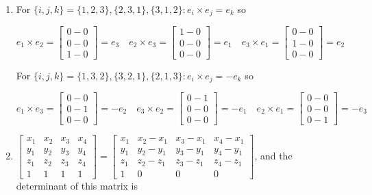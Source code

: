 \documentclass{article}
\begin{document}
\begin{enumerate}
	\item For $\{i,j,k\}=\{1,2,3\},\{2,3,1\},\{3,1,2\}: e_i\times e_j=e_k$ so
	\begin{center}
	$e_1\times e_2 = \begin{bmatrix} 0-0 \\ 0-0 \\ 1-0 \end{bmatrix} =e_3 \quad e_2\times e_3=\begin{bmatrix} 1-0 \\ 0-0 \\ 0-0 \end{bmatrix} = e_1 \quad e_3\times e_1 = \begin{bmatrix} 0-0 \\ 1-0 \\ 0-0 \end{bmatrix} =e_2$	
	\end{center}
For $\{i,j,k\}=\{1,3,2\},\{3,2,1\},\{2,1,3\}: e_i\times e_j=-e_k$ so
\begin{center}
$e_1\times e_3 = \begin{bmatrix} 0-0 \\ 0-1 \\ 0-0 \end{bmatrix} =-e_2 \quad e_3\times e_2=\begin{bmatrix} 0-1 \\ 0-0 \\ 0-0 \end{bmatrix} = -e_1 \quad e_2\times e_1 = \begin{bmatrix} 0-0 \\ 0-0 \\ 0-1 \end{bmatrix} =-e_3$	
\end{center} 

	\item $\begin{bmatrix} x_1 & x_2 & x_3 & x_4 \\ y_1 & y_2 & y_3 & y_4 \\ z_1 & z_2 & z_3 & z_4 \\ 1 & 1 & 1 & 1 \end{bmatrix} = \begin{bmatrix} x_1 & x_2-x_1 & x_3-x_1 & x_4-x_1 \\ y_1 & y_2-y_1 & y_3-y_1 & y_4-y_1 \\ z_1 & z_2-z_1 & z_3-z_1 & z_4-z_1 \\ 1 & 0 & 0 & 0 \end{bmatrix} $, and the determinant of this matrix is 
	

\end{enumerate}
\end{document}
